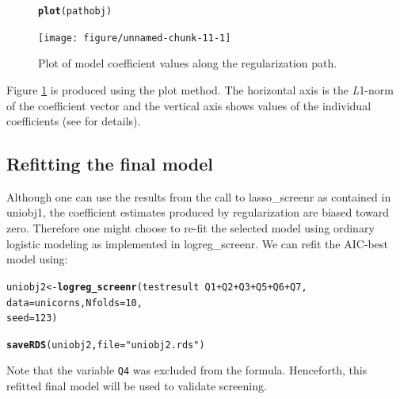 \documentclass[11pt]{report}\usepackage[]{graphicx}\usepackage[]{xcolor}
\makeatletter
\newcommand{\hlnum}[1]{\textcolor[rgb]{0.686,0.059,0.569}{#1}}%
\newcommand{\hlstr}[1]{\textcolor[rgb]{0.192,0.494,0.8}{#1}}%
\newcommand{\hlopt}[1]{\textcolor[rgb]{0,0,0}{#1}}%
\newcommand{\hlstd}[1]{\textcolor[rgb]{0.345,0.345,0.345}{#1}}%
\newcommand{\hlkwb}[1]{\textcolor[rgb]{0.69,0.353,0.396}{#1}}%
\newcommand{\hlkwc}[1]{\textcolor[rgb]{0.333,0.667,0.333}{#1}}%
\newcommand{\hlkwd}[1]{\textcolor[rgb]{0.737,0.353,0.396}{\textbf{#1}}}%
\newenvironment{kframe}{%
 \def\at@end@of@kframe{}%
 \ifinner\ifhmode%
  \def\at@end@of@kframe{\end{minipage}}%
  \begin{minipage}{\columnwidth}%
 \fi\fi%
 \def\FrameCommand##1{\hskip\@totalleftmargin \hskip-\fboxsep
 \colorbox{shadecolor}{##1}\hskip-\fboxsep
     \hskip-\linewidth \hskip-\@totalleftmargin \hskip\columnwidth}%
 \MakeFramed {\advance\hsize-\width
   \@totalleftmargin\z@ \linewidth\hsize
   \@setminipage}}%
 {\par\unskip\endMakeFramed%
 \at@end@of@kframe}
\newenvironment{knitrout}{}{} %
\makeatother
\begin{document}
\begin{figure}[!h]
  \begin{center}
\begin{knitrout}
\color{fgcolor}\begin{kframe}
\begin{alltt}
\hlkwd{plot}\hlstd{(pathobj)}
\end{alltt}
\end{kframe}
\texttt{[image: figure/unnamed-chunk-11-1]} 
\end{knitrout}
\caption{Plot of model coefficient values along the regularization
  path.}
\label{fig:f1}
\end{center}
\end{figure}
Figure \ref{fig:f1} is produced using the \textsf{plot} method. The horizontal
axis is the \emph{L}1-norm of the coefficient vector and the vertical
axis shows values of the individual coefficients (see
\citep{Park+Hastie2007} for details).


\subsection*{Refitting the final model}

Although one can use the results from the call to \textsf{lasso\_screenr}
as contained in \textsf{uniobj1}, the coefficient estimates
produced by regularization are biased toward zero.  Therefore one
might choose to re-fit the selected model\citep{Hastie+al2009} using ordinary logistic
modeling\citep{Teferi+al2022} as implemented in \textsf{logreg\_screenr}.  We can refit the
AIC-best model using:
\begin{knitrout}
\color{fgcolor}\begin{kframe}
\begin{alltt}
\hlstd{uniobj2} \hlkwb{<-} \hlkwd{logreg_screenr}\hlstd{(testresult} \hlopt{~} \hlstd{Q1} \hlopt{+} \hlstd{Q2} \hlopt{+} \hlstd{Q3} \hlopt{+} \hlstd{Q5} \hlopt{+} \hlstd{Q6} \hlopt{+} \hlstd{Q7,}
                          \hlkwc{data} \hlstd{= unicorns,} \hlkwc{Nfolds} \hlstd{=} \hlnum{10}\hlstd{,}
                          \hlkwc{seed} \hlstd{=} \hlnum{123}\hlstd{)}
\end{alltt}


{\ttfamily\noindent\itshape\color{messagecolor}{\#\# Setting levels: control = 0, case = 1}}

{\ttfamily\noindent\itshape\color{messagecolor}{\#\# Setting direction: controls < cases}}

{\ttfamily\noindent\itshape\color{messagecolor}{\#\# Setting levels: control = 0, case = 1}}

{\ttfamily\noindent\itshape\color{messagecolor}{\#\# Setting direction: controls < cases}}\begin{alltt}
\hlkwd{saveRDS}\hlstd{(uniobj2,} \hlkwc{file} \hlstd{=} \hlstr{"uniobj2.rds"} \hlstd{)}
\end{alltt}
\end{kframe}
\end{knitrout}
Note that the variable \verb|Q4| was excluded from the formula.
Henceforth, this refitted final model will be used to validate screening.
\end{document}
